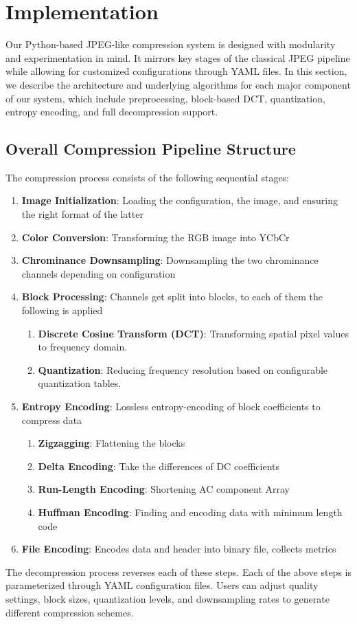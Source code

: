 \section{Implementation}
\label{sec:implementation}

Our Python-based JPEG-like compression system is designed with modularity and experimentation in mind. It mirrors key stages of the classical JPEG pipeline while allowing for customized configurations through YAML files. In this section, we describe the architecture and underlying algorithms for each major component of our system, which include preprocessing, block-based DCT, quantization, entropy encoding, and full decompression support.

\subsection{Overall Compression Pipeline Structure}
The compression process consists of the following sequential stages:
\begin{enumerate}
    \item \textbf{Image Initialization}: Loading the configuration, the image, and ensuring the right format of the latter
    \item \textbf{Color Conversion}: Transforming the RGB image into YCbCr
    \item \textbf{Chrominance Downsampling}: Downsampling the two chrominance channels depending on configuration
    \item \textbf{Block Processing}: Channels get split into blocks, to each of them the following is applied
    \begin{enumerate}
    	\item \textbf{Discrete Cosine Transform (DCT)}: Transforming spatial pixel values to frequency domain.
		\item \textbf{Quantization}: Reducing frequency resolution based on configurable quantization tables.
    \end{enumerate}
    \item \textbf{Entropy Encoding}: Lossless entropy-encoding of block coefficients to compress data
        \begin{enumerate}
    	\item \textbf{Zigzagging}: Flattening the blocks
    	\item \textbf{Delta Encoding}: Take the differences of DC coefficients
    	\item \textbf{Run-Length Encoding}: Shortening AC component Array 
    	\item \textbf{Huffman Encoding}: Finding and encoding data with minimum length code 
    \end{enumerate}
    \item \textbf{File Encoding}: Encodes data and header into binary file, collects metrics
\end{enumerate}
\noindent
The decompression process reverses each of these steps.
\noindent
Each of the above steps is parameterized through YAML configuration files. Users can adjust quality settings, block sizes, quantization levels, and downsampling rates to generate different compression schemes.

